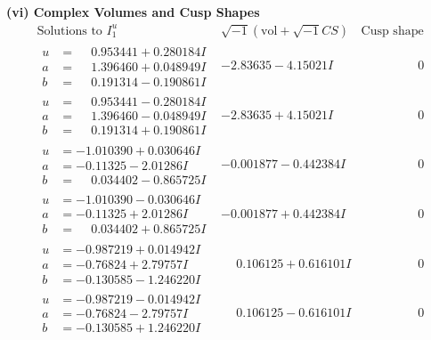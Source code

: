 \documentclass[1p]{elsarticle_modified}
\theoremstyle{definition}
\newcommand{\I}{\sqrt{-1}}
\begin{document}
\newpage\flushleft \textbf{(vi) Complex Volumes and Cusp Shapes}
$$\begin{array}{c|c|c}  
\text{Solutions to }I^u_{1}& \I (\text{vol} + \sqrt{-1}CS) & \text{Cusp shape}\\
 \hline 
\begin{aligned}
u &= \phantom{-}0.953441 + 0.280184 I \\
a &= \phantom{-}1.396460 + 0.048949 I \\
b &= \phantom{-}0.191314 - 0.190861 I\end{aligned}
 & -2.83635 - 4.15021 I & \phantom{-0.000000 } 0 \\ \hline\begin{aligned}
u &= \phantom{-}0.953441 - 0.280184 I \\
a &= \phantom{-}1.396460 - 0.048949 I \\
b &= \phantom{-}0.191314 + 0.190861 I\end{aligned}
 & -2.83635 + 4.15021 I & \phantom{-0.000000 } 0 \\ \hline\begin{aligned}
u &= -1.010390 + 0.030646 I \\
a &= -0.11325 - 2.01286 I \\
b &= \phantom{-}0.034402 - 0.865725 I\end{aligned}
 & -0.001877 - 0.442384 I & \phantom{-0.000000 } 0 \\ \hline\begin{aligned}
u &= -1.010390 - 0.030646 I \\
a &= -0.11325 + 2.01286 I \\
b &= \phantom{-}0.034402 + 0.865725 I\end{aligned}
 & -0.001877 + 0.442384 I & \phantom{-0.000000 } 0 \\ \hline\begin{aligned}
u &= -0.987219 + 0.014942 I \\
a &= -0.76824 + 2.79757 I \\
b &= -0.130585 - 1.246220 I\end{aligned}
 & \phantom{-}0.106125 + 0.616101 I & \phantom{-0.000000 } 0 \\ \hline\begin{aligned}
u &= -0.987219 - 0.014942 I \\
a &= -0.76824 - 2.79757 I \\
b &= -0.130585 + 1.246220 I\end{aligned}
 & \phantom{-}0.106125 - 0.616101 I & \phantom{-0.000000 } 0 \\ \hline\begin{aligned}

\end{aligned}
\end{array}$$
\end{document}
